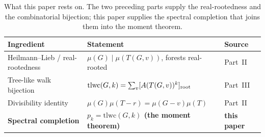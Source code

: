\documentclass[11pt]{article}
\begin{document}
\begin{table}[h]
\centering\small
\caption{What this paper rests on. The two preceding parts supply the real-rootedness and the
combinatorial bijection; this paper supplies the spectral completion that joins them into the moment
theorem.}
\label{tab:deps}
\begin{tabular}{@{}lll@{}}
\toprule
\rowcolor{ggteal}
{\color{white}\textbf{Ingredient}} & {\color{white}\textbf{Statement}} & {\color{white}\textbf{Source}}\\
\midrule
Heilmann--Lieb / real-rootedness & $\mu(G)\mid\mu(T(G,v))$, forests real-rooted & Part~II~\cite{PartII}\\
Tree-like walk bijection & $\mathrm{tlwc}(G,k)=\sum_v[A(T(G,v))^k]_{\rm root}$ & Part~III~\cite{PartIII}\\
Divisibility identity & $\mu(G)\mu(T{-}r)=\mu(G{-}v)\mu(T)$ & Part~II~\cite{PartII}\\
\textbf{Spectral completion} & \textbf{$p_k=\mathrm{tlwc}(G,k)$ (the moment theorem)} & \textbf{this paper}\\
\bottomrule
\end{tabular}
\end{table}
\end{document}
